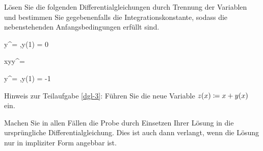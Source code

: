 \begin{atiTask}[
	topic = Gewöhnliche Differentialgleichungen,
	subtopic = Separable Differentialgleichungen,
	title = Die Methode der Variablentrennung,
	points = 16,
	language = deutsch,
]
	\begin{atiSubtasks}
		\item{
			\label{atisubtask:methode_der_variablentrennung-a}
			Lösen Sie die folgenden Differentialgleichungen durch Trennung der Variablen und bestimmen Sie gegebenenfalls die Integrationskonstante, sodass die nebenstehenden Anfangsbedingungen erfüllt sind.
			\begin{atiSubequations}
				\item{
					\label{dgl-1}
					y^\prime = ,\qquad y(1) = 0
				}
				\item{
					\label{dgl-2}
					xyy^\prime = 
				}
				\item{
					\label{dgl-3}
					y^\prime = ,\qquad y(1) = -1
				}
			\end{atiSubequations}
			Hinweis zur Teilaufgabe \ref{dgl-3}: Führen Sie die neue Variable $z(x)\coloneqq x + y(x)$ ein.
		}

		\item{
			\label{atisubtask:methode_der_variablentrennung-b}
			Machen Sie in allen Fällen die Probe durch Einsetzen Ihrer Lösung in die ursprüngliche Differentialgleichung. Dies ist auch dann verlangt, wenn die Lösung nur in impliziter Form angebbar ist.
		}
	\end{atiSubtasks}
\end{atiTask}

